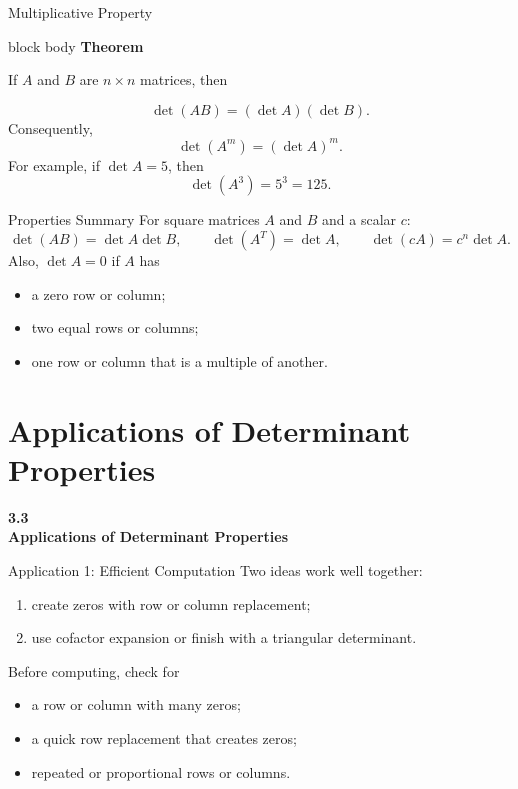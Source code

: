\documentclass[aspectratio=169]{beamer}
\newcommand{\sectioncard}[2]{%
  \begin{frame}[plain]
    \vfill\centering
    {\Huge\color{lectureorange}\bfseries #1\\[1ex]#2}
    \vfill
  \end{frame}}
\newcommand{\theorembox}[2]{%
  \begin{beamercolorbox}[sep=1.2ex,wd=\linewidth]{block body}
    \textbf{#1}\par #2
  \end{beamercolorbox}}
\begin{document}
\begin{frame}{Multiplicative Property}
\theorembox{Theorem}{If $A$ and $B$ are $n\times n$ matrices, then}
\[
\boxed{\det(AB)=(\det A)(\det B)}.
\]
\pause
Consequently,
\[
\det(A^m)=(\det A)^m.
\]
For example, if $\det A=5$, then
\[
\det(A^3)=5^3=125.
\]
\end{frame}

\begin{frame}{Properties Summary}
For square matrices $A$ and $B$ and a scalar $c$:
\[
\det(AB)=\det A\det B,
\qquad
\det(A^T)=\det A,
\qquad
\det(cA)=c^n\det A.
\]
Also, $\det A=0$ if $A$ has
\begin{itemize}
  \item a zero row or column;
  \item two equal rows or columns;
  \item one row or column that is a multiple of another.
\end{itemize}
\end{frame}

\section[Determinant Applications]{Applications of Determinant Properties}
\sectioncard{3.3}{Applications of Determinant Properties}

\begin{frame}{Application 1: Efficient Computation}
Two ideas work well together:
\begin{enumerate}
  \item create zeros with row or column replacement;
  \item use cofactor expansion or finish with a triangular determinant.
\end{enumerate}
\pause
Before computing, check for
\begin{itemize}
  \item a row or column with many zeros;
  \item a quick row replacement that creates zeros;
  \item repeated or proportional rows or columns.
\end{itemize}
\end{frame}
\end{document}
